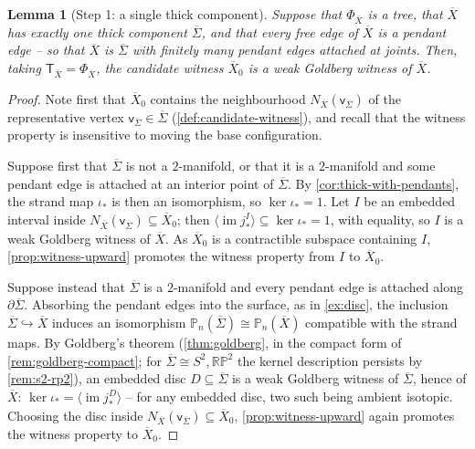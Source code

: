 \documentclass[reqno]{amsart}
\newtheorem{lemma}[theorem]{Lemma}
\theoremstyle{definition}
\newcommand\sfT{\mathsf{T}}
\newcommand\sfv{\mathsf{v}}
\newcommand{\PB}{\mathbb{P}}
\newcommand{\im}{\operatorname{im}}
\newcommand{\RP}{\mathbb{RP}}
\newcommand{\co}[1]{\mathopen{\langle}#1\mathclose{\rangle}} %
\renewcommand{\bar}{\overline}
\numberwithin{equation}{section}
\begin{document}
\begin{lemma}[Step 1: a single thick component]
\label{lem:witness-one-thick}
Suppose that \(\Phi_{\bar X}\) is a tree, that \(\bar X\) has
exactly one thick component \(\bar\Sigma\), and that every free
edge of \(\bar X\) is a pendant edge -- so that \(\bar X\) is
\(\bar\Sigma\) with finitely many pendant edges attached at
joints. Then, taking \(\sfT_{\bar X}=\Phi_{\bar X}\), the candidate
witness \(\bar X_0\) is a weak Goldberg witness of \(\bar X\).
\end{lemma}

\begin{proof}
Note first that \(\bar X_0\) contains the neighbourhood
\(N_{\bar X}(\sfv_{\bar\Sigma})\) of the representative vertex
\(\sfv_{\bar\Sigma}\in\bar\Sigma\)
(\cref{def:candidate-witness}), and recall that the witness
property is insensitive to moving the base configuration.

Suppose first that \(\bar\Sigma\) is not a \(2\)-manifold, or
that it is a \(2\)-manifold and some pendant edge is attached at
an interior point of \(\bar\Sigma\). By
\cref{cor:thick-with-pendants}, the strand map \(\iota_\ast\) is
then an isomorphism, so \(\ker\iota_\ast=1\). Let \(I\) be an
embedded interval inside
\(N_{\bar X}(\sfv_{\bar\Sigma})\subseteq\bar X_0\); then
\(\co{\im j^{I}_\ast}\subseteq\ker\iota_\ast=1\), with equality,
so \(I\) is a weak Goldberg witness of \(\bar X\). As
\(\bar X_0\) is a contractible subspace containing \(I\),
\cref{prop:witness-upward} promotes the witness property from
\(I\) to \(\bar X_0\).

Suppose instead that \(\bar\Sigma\) is a \(2\)-manifold and
every pendant edge is attached along \(\partial\bar\Sigma\).
Absorbing the pendant edges into the surface, as in
\cref{ex:disc}, the inclusion
\(\bar\Sigma\hookrightarrow\bar X\) induces an isomorphism
\(\PB_n(\bar\Sigma)\cong\PB_n(\bar X)\) compatible with the
strand maps. By Goldberg's theorem (\cref{thm:goldberg}, in the
compact form of \cref{rem:goldberg-compact}; for
\(\bar\Sigma\cong S^2,\RP^2\) the kernel description persists by
\cref{rem:s2-rp2}), an embedded disc \(D\subseteq\bar\Sigma\)
is a weak Goldberg witness of \(\bar\Sigma\), hence of
\(\bar X\): \(\ker\iota_\ast=\co{\im j^{D}_\ast}\) -- for any
embedded disc, two such being ambient isotopic. Choosing the
disc inside \(N_{\bar X}(\sfv_{\bar\Sigma})\subseteq\bar X_0\),
\cref{prop:witness-upward} again promotes the witness property
to \(\bar X_0\).
\end{proof}
\end{document}
